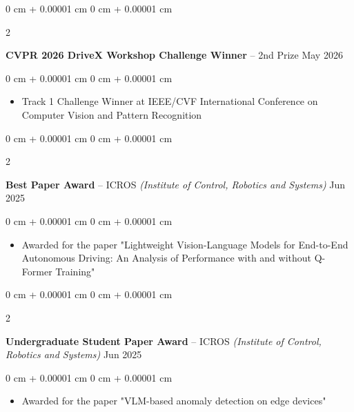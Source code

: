 \documentclass[10pt, letterpaper]{article}
\newenvironment{highlights}{
    \begin{itemize}[
        topsep=0.10 cm,
        parsep=0.10 cm,
        partopsep=0pt,
        itemsep=0pt,
        leftmargin=0 cm + 10pt
    ]
}{
    \end{itemize}
} %
\newenvironment{onecolentry}{
    \begin{adjustwidth}{
        0 cm + 0.00001 cm
    }{
        0 cm + 0.00001 cm
    }
}{
    \end{adjustwidth}
} %
\newenvironment{twocolentry}[2][]{
    \onecolentry
    \def\secondColumn{#2}
    \setcolumnwidth{\fill, 4.5 cm}
    \begin{paracol}{2}
}{
    \switchcolumn \raggedleft \secondColumn
    \end{paracol}
    \endonecolentry
} %
\begin{document}
        \begin{twocolentry}{
            May 2026
        }
            \textbf{CVPR 2026 DriveX Workshop Challenge Winner} -- 2nd Prize\end{twocolentry}
        \vspace{0.10 cm}
        \begin{onecolentry}
            \begin{highlights}
                \item Track 1 Challenge Winner at IEEE/CVF International Conference on Computer Vision and Pattern Recognition
            \end{highlights}
        \end{onecolentry}
        \vspace{0.2 cm}
        
        \begin{twocolentry}{
            Jun 2025
        }
            \textbf{Best Paper Award} -- ICROS \textit{\footnotesize (Institute of Control, Robotics and Systems)}\end{twocolentry}
        \vspace{0.10 cm}
        \begin{onecolentry}
            \begin{highlights}
                \item Awarded for the paper "Lightweight Vision-Language Models for End-to-End Autonomous Driving: An Analysis of Performance with and without Q-Former Training"
            \end{highlights}
        \end{onecolentry}
        \vspace{0.2 cm}

        \begin{twocolentry}{
            Jun 2025
        }
            \textbf{Undergraduate Student Paper Award } -- ICROS \textit{\footnotesize (Institute of Control, Robotics and Systems)}\end{twocolentry}
        \vspace{0.10 cm}
        \begin{onecolentry}
            \begin{highlights}
                \item Awarded for the paper "VLM-based anomaly detection on edge devices"
            \end{highlights}
        \end{onecolentry}
        
        \vspace{0.2 cm}
        
\end{document}
